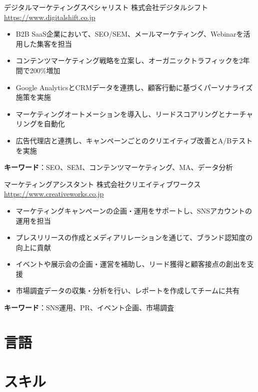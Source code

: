 \documentclass[a4paper, serif, 10pt]{moderncv}
\begin{document}
        {デジタルマーケティングスペシャリスト}
        {株式会社デジタルシフト}
        {\url{https://www.digitalshift.co.jp}}
        {}
        {\begin{itemize}
\item B2B SaaS企業において、SEO/SEM、メールマーケティング、Webinarを活用した集客を担当
\item コンテンツマーケティング戦略を立案し、オーガニックトラフィックを2年間で200\%増加
\item Google AnalyticsとCRMデータを連携し、顧客行動に基づくパーソナライズ施策を実施
\item マーケティングオートメーションを導入し、リードスコアリングとナーチャリングを自動化
\item 広告代理店と連携し、キャンペーンごとのクリエイティブ改善とA/Bテストを実施
\end{itemize}
\textbf{キーワード}：SEO、SEM、コンテンツマーケティング、MA、データ分析}

        {マーケティングアシスタント}
        {株式会社クリエイティブワークス}
        {\url{https://www.creativeworks.co.jp}}
        {}
        {\begin{itemize}
\item マーケティングキャンペーンの企画・運用をサポートし、SNSアカウントの運用を担当
\item プレスリリースの作成とメディアリレーションを通じて、ブランド認知度の向上に貢献
\item イベントや展示会の企画・運営を補助し、リード獲得と顧客接点の創出を支援
\item 市場調査データの収集・分析を行い、レポートを作成してチームに共有
\end{itemize}
\textbf{キーワード}：SNS運用、PR、イベント企画、市場調査}
\section{言語}

\section{スキル}

\end{document}
